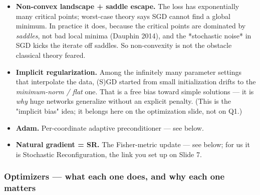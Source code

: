 \documentclass[11pt]{article}
\begin{document}
\begin{itemize}
\item \textbf{Non-convex landscape + saddle escape.} The loss has exponentially many
critical points; worst-case theory says SGD cannot find a global minimum.
In practice it does, because the critical points are dominated by
\emph{saddles}, not bad local minima (Dauphin 2014), and the *stochastic
noise* in SGD kicks the iterate off saddles. So non-convexity is not the
obstacle classical theory feared.
\item \textbf{Implicit regularization.} Among the infinitely many parameter settings
that interpolate the data, (S)GD started from small initialization drifts
to the \emph{minimum-norm / flat} one. That is a free bias toward simple
solutions --- it is \emph{why} huge networks generalize without an explicit
penalty. (This is the "implicit bias" idea; it belongs here on the
optimization slide, not on Q1.)
\item \textbf{Adam.} Per-coordinate adaptive preconditioner --- see below.
\item \textbf{Natural gradient = SR.} The Fisher-metric update --- see below; for us it
is Stochastic Reconfiguration, the link you set up on Slide 7.
\end{itemize}
\subsubsection*{Optimizers --- what each one does, and why each one matters}
\end{document}
